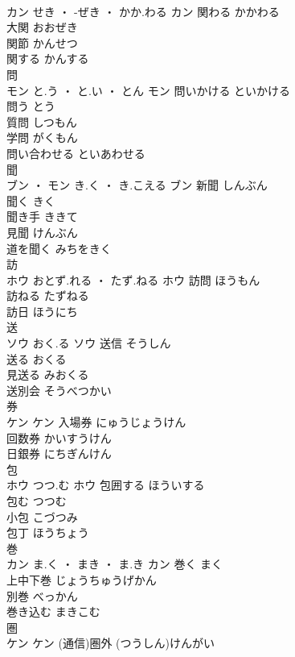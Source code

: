 \documentclass[8pt]{extreport}
\begin{document}
\begin{CJK}{UTF8}{min}
\\	カン	せき ・ -ぜき ・ かか.わる	カン	関わる	かかわる	
\\	大関	おおぜき	
\\	関節	かんせつ	
\\	関する	かんする	
\\	問	
\\	モン	と.う ・ と.い ・ とん	モン	問いかける	といかける	
\\	問う	とう	
\\	質問	しつもん	
\\	学問	がくもん	
\\	問い合わせる	といあわせる	
\\	聞	
\\	ブン ・ モン	き.く ・ き.こえる	ブン	新聞	しんぶん	
\\	聞く	きく	
\\	聞き手	ききて	
\\	見聞	けんぶん	
\\	道を聞く	みちをきく	
\\	訪	
\\	ホウ	おとず.れる ・ たず.ねる	ホウ	訪問	ほうもん	
\\	訪ねる	たずねる	
\\	訪日	ほうにち	
\\	送	
\\	ソウ	おく.る	ソウ	送信	そうしん	
\\	送る	おくる	
\\	見送る	みおくる	
\\	送別会	そうべつかい	
\\	券	
\\	ケン		ケン	入場券	にゅうじょうけん	
\\	回数券	かいすうけん	
\\	日銀券	にちぎんけん	
\\	包	
\\	ホウ	つつ.む	ホウ	包囲する	ほういする	
\\	包む	つつむ	
\\	小包	こづつみ	
\\	包丁	ほうちょう	
\\	巻	
\\	カン	ま.く ・ まき ・ ま.き	カン	巻く	まく	
\\	上中下巻	じょうちゅうげかん	
\\	別巻	べっかん	
\\	巻き込む	まきこむ	
\\	圏	
\\	ケン		ケン	(通信)圏外	(つうしん)けんがい	

\end{CJK}
\end{document}
